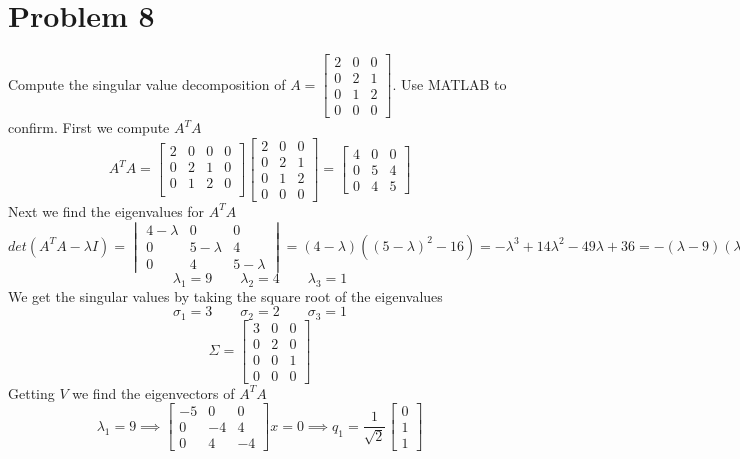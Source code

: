 \documentclass{article}
\begin{document}
\section*{Problem 8}
Compute the singular value decomposition of $A = \begin{bmatrix} 2 & 0 & 0 \\ 0 & 2 & 1 \\ 0 & 1 & 2 \\ 0 & 0 & 0 \end{bmatrix}$.
{\color{blue} Use MATLAB to confirm.}
\newline
First we compute $A^TA$
$$A^TA =
\begin{bmatrix}
2 & 0 & 0 & 0 \\
0 & 2 & 1 & 0 \\
0 & 1 & 2 & 0 \\
\end{bmatrix}
\begin{bmatrix}
2 & 0 & 0 \\
0 & 2 & 1 \\
0 & 1 & 2 \\
0 & 0 & 0
\end{bmatrix}
=
\begin{bmatrix}
4 & 0 & 0 \\
0 & 5 & 4 \\
0 & 4 & 5
\end{bmatrix}
$$
Next we find the eigenvalues for $A^TA$
$$det(A^TA - \lambda I)
=
\begin{vmatrix}
4-\lambda & 0 & 0 \\
0 & 5-\lambda & 4 \\
0 & 4 & 5-\lambda
\end{vmatrix}
=
(4-\lambda)((5-\lambda)^2-16)
=-\lambda ^3+14 \lambda ^2-49 \lambda +36
=-(\lambda -9) (\lambda -4) (\lambda -1)
$$
$$ \lambda_1 = 9 \qquad \lambda_2 = 4 \qquad \lambda_3 = 1 $$
We get the singular values by taking the square root of the eigenvalues
$$ \sigma_1 = 3 \qquad \sigma_2 = 2 \qquad \sigma_3 = 1 $$
$$
\Sigma =
\begin{bmatrix}
3 & 0 & 0 \\
0 & 2 & 0 \\
0 & 0 & 1 \\
0 & 0 & 0
\end{bmatrix}
$$
Getting $V$ we find the eigenvectors of $A^TA$
$$
\lambda_1 = 9 \implies
\begin{bmatrix}
-5 & 0 & 0 \\
0 & -4 & 4 \\
0 & 4 & -4
\end{bmatrix}
x
=0
\implies q_1 =
\frac{1}{\sqrt{2}}
\begin{bmatrix}
0 \\
1 \\
1
\end{bmatrix}
$$
\end{document}
